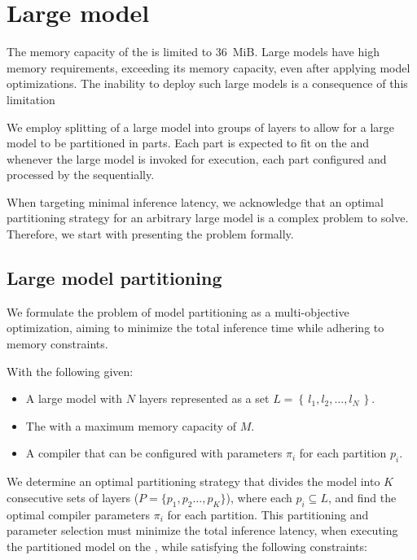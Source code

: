 \section{Large model}
The memory capacity of the \graicore{} is limited to \SI{36}{MiB}.
Large models have high memory requirements, exceeding its memory capacity, even after applying model optimizations.
The inability to deploy such large models is a consequence of this limitation

We employ splitting of a large model into groups of layers to allow for a large model to be partitioned in parts.
Each part is expected to fit on the \graicore{} and whenever the large model is invoked for execution, each part configured and processed by the \graicore{} sequentially.

When targeting minimal inference latency, we acknowledge that an optimal partitioning strategy for an arbitrary large model is a complex problem to solve.
Therefore, we start with presenting the problem formally.

\subsection{Large model partitioning}
We formulate the problem of model partitioning as a multi-objective optimization, aiming to minimize the total inference time while adhering to memory constraints.

With the following given:
\begin{itemize}
    \item A large model with $N$ layers represented as a set $L = \left\{ \, l_1, l_2, \ldots, l_N \, \right\}$.
    \item The \graicore{} with a maximum memory capacity of $M$.
    \item A compiler that can be configured with parameters $\pi_i$ for each partition $p_i$.
\end{itemize}
We determine an optimal partitioning strategy that divides the model into $K$ consecutive sets of layers ($P = \{p_1, p_2 \ldots, p_K\}$), where each $p_i \subseteq L$, and find the optimal compiler parameters $\pi_i$ for each partition.
This partitioning and parameter selection must minimize the total inference latency, when executing the partitioned model on the \graicore{}, while satisfying the following constraints:

